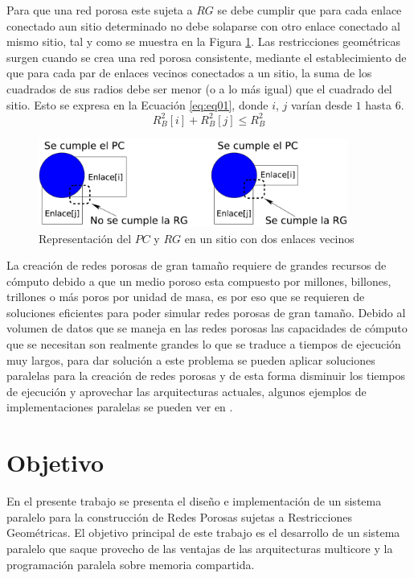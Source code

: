 Para que una red porosa este sujeta a $RG$ se debe cumplir que para cada enlace conectado aun sitio determinado no debe solaparse con otro enlace conectado al mismo sitio, tal y como se muestra en la Figura \ref{fig:CPyGR}. Las restricciones geométricas surgen cuando se crea una red porosa consistente, mediante el establecimiento de que para cada par de enlaces vecinos conectados a un sitio, la suma de los cuadrados de sus radios debe ser menor (o a lo más igual) que el cuadrado del sitio. Esto se expresa en la Ecuación \ref{eq:eq01}, donde $i$, $j$ varían desde $1$ hasta $6$.\\

\begin{equation}
R_{B}^2[i]+R_{B}^2[j] \leq R_{B}^2
\label{eq:eq01}
\end{equation}

\begin{figure}[hbtp]
\centering
\includegraphics[width=4.0in]{img/CPyGC_es.pdf}
\caption{Representación del $PC$ y $RG$ en un sitio con dos enlaces vecinos}
\label{fig:CPyGR}
\end{figure}

La creación de redes porosas de gran tamaño requiere de grandes recursos de cómputo debido a que un medio poroso esta compuesto por millones, billones, trillones o más poros por unidad de masa, es por eso que se requieren de soluciones eficientes  para poder simular redes porosas de gran tamaño. Debido al volumen de datos que se maneja en las redes porosas las capacidades de cómputo que se necesitan son realmente grandes lo que se traduce a tiempos de ejecución muy largos, para dar solución a este problema se pueden aplicar soluciones paralelas para la creación de redes porosas y de esta forma disminuir los tiempos de ejecución y aprovechar las arquitecturas actuales, algunos ejemplos de implementaciones paralelas se pueden ver en \cite{ref4}.\\


\section{Objetivo}
En el presente trabajo se presenta el diseño e implementación de un sistema paralelo para la construcción de Redes Porosas sujetas a Restricciones Geométricas. El objetivo principal de  este trabajo es el desarrollo de un sistema paralelo que saque provecho de las ventajas de las arquitecturas multicore y la programación paralela sobre memoria compartida.


